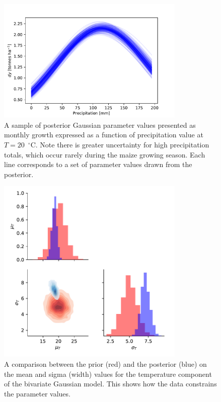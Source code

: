 \documentclass[12pt]{article}
\begin{document}
\begin{figure}
\centering
\includegraphics[width=0.8\textwidth]{./figures/2d_Gauss_precip_post_sample_growth_curve}
\caption{\label{fig:2d_Gauss_precip_post_sample_growth_curve} A sample of posterior Gaussian parameter values presented as monthly growth expressed as a function of precipitation value at $T = 20$~$^\circ$C. Note there is greater uncertainty for high precipitation totals, which occur rarely during the maize growing season. Each line corresponds to a set of parameter values drawn from the posterior.}
\end{figure}

\begin{figure}
\centering
\includegraphics[width=0.8\textwidth]{./figures/2d_Gauss_prior_vs_post_temp_mean_vs_sigma}
\caption{\label{fig:2d_Gauss_prior_vs_post_temp_mean_vs_sigma} A comparison between the prior (red) and the posterior (blue) on the mean and sigma (width) values for the temperature component of the bivariate Gaussian model. This shows how the data constrains the parameter values.}
\end{figure}
\end{document}
